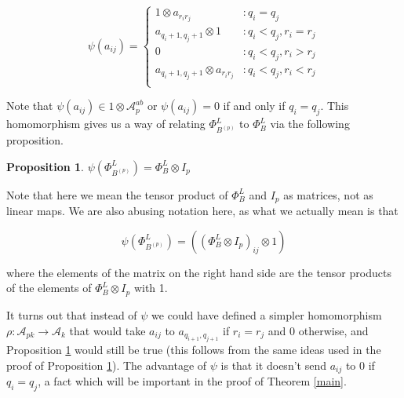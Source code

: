 \documentclass[11pt]{amsart}
\def\A{{\mathcal A}}
\newtheorem{prop}[thm]{Proposition}
\begin{document}
$$
\psi(a_{ij}) =
\left\{
     \begin{array}{lr}
       1\otimes a_{r_ir_j} & \colon q_i = q_j\\
       a_{q_i+1,q_j+1}\otimes 1 & \colon q_i<q_j,  r_i = r_j\\
       0 & \colon q_i<q_j,  r_i > r_j\\
       a_{q_i+1,q_j+1}\otimes a_{r_ir_j} & \colon q_i<q_j, r_i < r_j\\
     \end{array}
\right.
$$

\noindent Note that $\psi(a_{ij}) \in 1\otimes \A^{ab}_p$ or $\psi(a_{ij}) = 0$ if and only if $q_i = q_j$.  This homomorphism gives us a way of relating $\Phi_{B^{(p)}}^L$ to $\Phi_B^L$ via the following proposition.

\begin{prop}\label{psiofbp}
$\psi\left(\Phi_{B^{(p)}}^L\right) = \Phi_{B}^L\otimes I_p$
\end{prop}


Note that here we mean the tensor product of $\Phi_B^L$ and $I_p$ as matrices, not as linear maps.  We are also abusing notation here, as what we actually mean is that

$$\psi\left(\Phi_{B^{(p)}}^L\right) = \left(\left(\Phi_{B}^L\otimes I_p\right)_{ij}\otimes 1\right)$$

where the elements of the matrix on the right hand side are the tensor products of the elements of $\Phi_{B}^L\otimes I_p$ with 1. 

It turns out that instead of $\psi$ we could have defined a simpler homomorphism $\rho\colon \A_{pk}\rightarrow \A_k$ that would take $a_{ij}$ to $a_{q_{i+1},q_{j+1}}$ if $r_i=r_j$ and 0 otherwise, and Proposition \ref{psiofbp} would still be true (this follows from the same ideas used in the proof of Proposition \ref{psiofbp}).  The advantage of $\psi$ is that it doesn't send $a_{ij}$ to 0 if $q_i=q_j$, a fact which will be important in the proof of Theorem \ref{main}.
\end{document}
